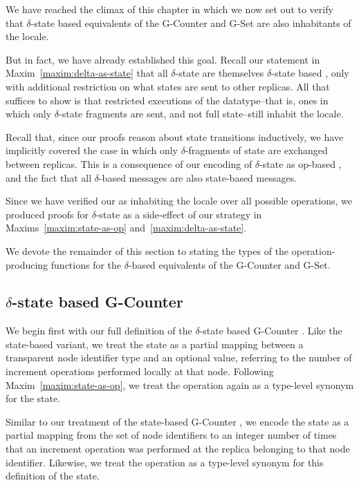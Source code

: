 We have reached the climax of this chapter in which we now set out to verify
that $\delta$-state based \CRDT equivalents of the G-Counter and G-Set are also
inhabitants of the \SEC locale.

But in fact, we have already established this goal. Recall our statement in
Maxim~\ref{maxim:delta-as-state} that all $\delta$-state \CRDTs are themselves
$\delta$-state based \CRDTs, only with additional restriction on what states are
sent to other replicas. All that suffices to show is that restricted executions
of the datatype--that is, ones in which only $\delta$-state fragments are sent,
and not full state--still inhabit the \SEC locale.

Recall that, since our proofs reason about state transitions inductively, we
have implicitly covered the case in which only $\delta$-fragments of state are
exchanged between replicas. This is a consequence of our encoding of
$\delta$-state \CRDTs as op-based \CRDTs, and the fact that all $\delta$-based
\CRDT messages are also state-based \CRDT messages.

Since we have verified our \CRDTs as inhabiting the \SEC locale over all
possible operations, we produced proofs for $\delta$-state \CRDTs as a
side-effect of our strategy in Maxims~\ref{maxim:state-as-op}
and~\ref{maxim:delta-as-state}.

We devote the remainder of this section to stating the types of the
operation-producing functions for the $\delta$-based \CRDT equivalents of the
G-Counter and G-Set.

\subsection{$\delta$-state based G-Counter}
\label{sec:isabelle-delta-gcounter}

We begin first with our full definition of the $\delta$-state based G-Counter
\CRDT. Like the state-based variant, we treat the state as a partial mapping
between a transparent node identifier type and an optional value, referring to
the number of increment operations performed locally at that node. Following
Maxim~\ref{maxim:state-as-op}, we treat the operation again as a type-level
synonym for the state.

Similar to our treatment of the state-based G-Counter \CRDT, we encode the state
as a partial mapping from the set of node identifiers to an integer number of
times that an increment operation was performed at the replica belonging to that
node identifier. Likewise, we treat the operation as a type-level synonym for
this definition of the state.

